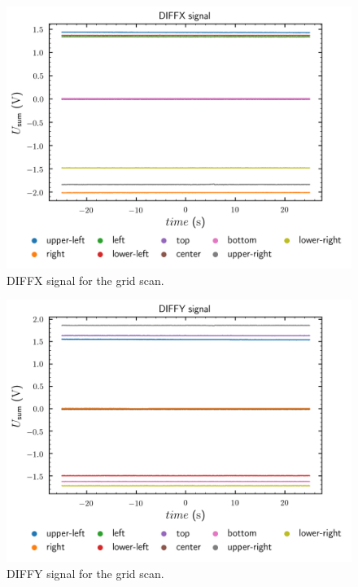 \begin{figure}[htb]
	\centering
	\includegraphics{figure/plot/diffx}
	\caption{DIFFX signal for the grid scan.}\label{fig:grid_scan_diffx}
\end{figure}
\begin{figure}[htb]
	\centering
	\includegraphics{figure/plot/diffy}
	\caption{DIFFY signal for the grid scan.}\label{fig:grid_scan_diffy}
\end{figure}

